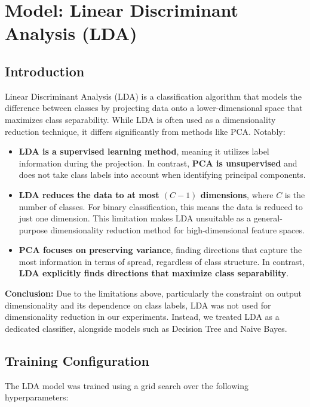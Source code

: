 \section{Model: Linear Discriminant Analysis (LDA)}

\subsection{Introduction}
Linear Discriminant Analysis (LDA) is a classification algorithm that models the difference between classes by projecting data onto a lower-dimensional space that maximizes class separability. While LDA is often used as a dimensionality reduction technique, it differs significantly from methods like PCA. Notably:

\begin{itemize}
    \item \textbf{LDA is a supervised learning method}, meaning it utilizes label information during the projection. In contrast, \textbf{PCA is unsupervised} and does not take class labels into account when identifying principal components.
    
    \item \textbf{LDA reduces the data to at most $(C - 1)$ dimensions}, where $C$ is the number of classes. For binary classification, this means the data is reduced to just one dimension. This limitation makes LDA unsuitable as a general-purpose dimensionality reduction method for high-dimensional feature spaces.
    
    \item \textbf{PCA focuses on preserving variance}, finding directions that capture the most information in terms of spread, regardless of class structure. In contrast, \textbf{LDA explicitly finds directions that maximize class separability}.
\end{itemize}

\textbf{Conclusion:} Due to the limitations above, particularly the constraint on output dimensionality and its dependence on class labels, LDA was not used for dimensionality reduction in our experiments. Instead, we treated LDA as a dedicated classifier, alongside models such as Decision Tree and Naive Bayes.

\subsection{Training Configuration}
The LDA model was trained using a grid search over the following hyperparameters:

